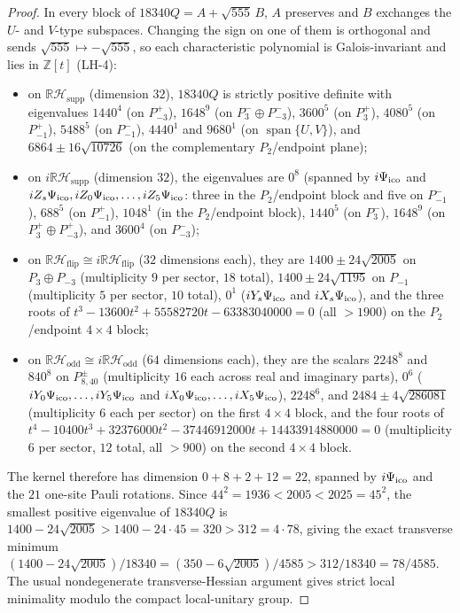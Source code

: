 \begin{proof}
In every block of $18340Q=A+\sqrt{555}\,B$, $A$ preserves and $B$ exchanges the $U$- and $V$-type subspaces. Changing the sign on one of
them is orthogonal and sends $\sqrt{555}\mapsto-\sqrt{555}$, so each characteristic polynomial is Galois-invariant
and lies in $\mathbb Z[t]$ (LH-4):
\begin{itemize}
\item on $\mathbb R\mathcal H_{\mathrm{supp}}$ (dimension $32$), $18340Q$ is strictly positive definite with eigenvalues
$1440^4$ (on $P_{-3}^+$), $1648^9$ (on $P_3^-\oplus P_{-3}^-$), $3600^5$ (on $P_3^+$), $4080^5$ (on $P_{-1}^+$),
$5488^5$ (on $P_{-1}^-$), $4440^1$ and $9680^1$ (on $\operatorname{span}\{U,V\}$),
and $6864\pm16\sqrt{10726}$ (on the complementary $P_2$/endpoint plane);
\item on $i\mathbb R\mathcal H_{\mathrm{supp}}$ (dimension $32$), the eigenvalues are $0^8$ (spanned by $i\Psi_{\mathrm{ico}}$ and
$iZ_s\Psi_{\mathrm{ico}},iZ_0\Psi_{\mathrm{ico}},\ldots,iZ_5\Psi_{\mathrm{ico}}$: three in the $P_2$/endpoint block and five on $P_{-1}^-$), $688^5$ (on $P_{-1}^+$),
$1048^1$ (in the $P_2$/endpoint block), $1440^5$ (on $P_3^-$), $1648^9$ (on $P_3^+\oplus P_{-3}^+$), and
$3600^4$ (on $P_{-3}^-$);
\item on $\mathbb R\mathcal H_{\mathrm{flip}}\cong i\mathbb R\mathcal H_{\mathrm{flip}}$ ($32$ dimensions each),
they are $1400\pm24\sqrt{2005}$ on $P_3\oplus P_{-3}$ (multiplicity $9$ per sector, $18$ total),
$1400\pm24\sqrt{1195}$ on $P_{-1}$ (multiplicity $5$ per sector, $10$ total), $0^1$ ($iY_s\Psi_{\mathrm{ico}}$ and
$iX_s\Psi_{\mathrm{ico}}$), and the three roots of $t^3-13600t^2+55582720t-63383040000=0$ (all $>1900$) on the $P_2$/endpoint
$4\times4$ block;
\item on $\mathbb R\mathcal H_{\mathrm{odd}}\cong i\mathbb R\mathcal H_{\mathrm{odd}}$ ($64$ dimensions each),
they are the scalars $2248^8$ and $840^8$ on $P_{8,40}^\pm$ (multiplicity $16$ each across real and imaginary
parts), $0^6$ ($iY_0\Psi_{\mathrm{ico}},\ldots,iY_5\Psi_{\mathrm{ico}}$ and $iX_0\Psi_{\mathrm{ico}},\ldots,iX_5\Psi_{\mathrm{ico}}$), $2248^6$, and
$2484\pm4\sqrt{286081}$ (multiplicity $6$ each per sector) on the first $4\times4$ block, and the
four roots of $t^4-10400t^3+32376000t^2-37446912000t+14433914880000=0$ (multiplicity $6$ per sector, $12$ total,
all $>900$) on the second $4\times4$ block.
\end{itemize}
The kernel therefore has dimension $0+8+2+12=22$, spanned by $i\Psi_{\mathrm{ico}}$ and the $21$ one-site Pauli rotations. Since
$44^2=1936<2005<2025=45^2$, the smallest positive eigenvalue of $18340Q$ is
$1400-24\sqrt{2005}>1400-24\cdot45=320>312=4\cdot78$, giving the exact transverse minimum
$(1400-24\sqrt{2005})/18340=(350-6\sqrt{2005})/4585>312/18340=78/4585$.
The usual nondegenerate transverse-Hessian argument gives strict local
minimality modulo the compact local-unitary group.
\end{proof}


